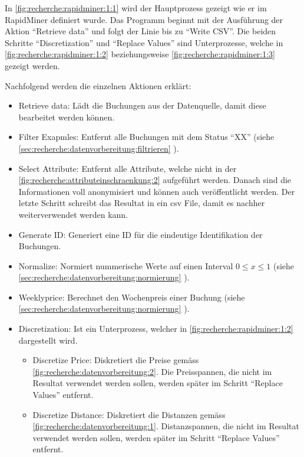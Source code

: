 In \ref{fig:recherche:rapidminer:1:1} wird der Hauptprozess gezeigt wie er im RapidMiner definiert wurde. Das Programm beginnt mit der Ausführung der Aktion "`Retrieve data"' und folgt der Linie bis zu "`Write CSV"'. Die beiden Schritte "`Discretization"' und "`Replace Values"' sind Unterprozesse, welche in \ref{fig:recherche:rapidminer:1:2} beziehungsweise \ref{fig:recherche:rapidminer:1:3} gezeigt werden.

Nachfolgend werden die einzelnen Aktionen erklärt:
 \begin{itemize}
 	\item Retrieve data: Lädt die Buchungen aus der Datenquelle, damit diese bearbeitet werden können. 
 	\item Filter Exapmles: Entfernt alle Buchungen mit dem Status "`XX"' (siehe \cref{sec:recherche:datenvorbereitung:filtrieren} ).
 	\item Select Attribute: Entfernt alle Attribute, welche nicht in der \cref{fig:recherche:attributeinschraenkung:2} aufgeführt werden. Danach sind die Informationen voll anonymisiert und können auch veröffentlicht werden. Der letzte Schritt schreibt das Resultat in ein \gls{csv} File, damit es nachher weiterverwendet werden kann.
 	\item Generate ID: Generiert eine ID für die eindeutige Identifikation der Buchungen.
 	\item Normalize: Normiert nummerische Werte auf einen Interval $0 \leq x \leq 1$ (siehe \cref{sec:recherche:datenvorbereitung:normierung} ).
 	\item Weeklyprice: Berechnet den Wochenpreis einer Buchung (siehe \cref{sec:recherche:datenvorbereitung:normierung} ).
 	\item Discretization: Ist ein Unterprozess, welcher in \cref{fig:recherche:rapidminer:1:2} dargestellt wird.
	 	\begin{itemize}
	 		\item Discretize Price: Diskretiert die Preise gemäss \cref{fig:recherche:datenvorbereitung:2}. Die Preisspannen, die nicht im Resultat verwendet werden sollen, werden später im Schritt "`Replace Values"' entfernt.
	 		\item Discretize Distance: Diskretiert die Distanzen gemäss \cref{fig:recherche:datenvorbereitung:1}. Distanzspannen, die nicht im Resultat verwendet werden sollen, werden später im Schritt "`Replace Values"' entfernt.

\end{itemize}
\end{itemize}
